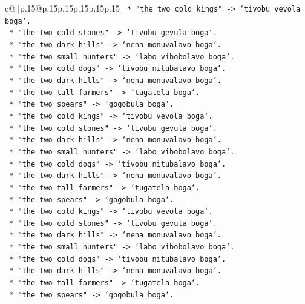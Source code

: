 \documentclass{article}
\begin{document}
{\begin{supertabular}{c@{$\;$}|p{.15\linewidth}@{}p{.15\linewidth}p{.15\linewidth}p{.15\linewidth}p{.15\linewidth}p{.15\linewidth}}
{{{\texttt{        *   "the two cold kings" {-}> `tivobu vevola boga`.} \\
\texttt{        *   "the two cold stones" {-}> `tivobu gevula boga`.} \\
\texttt{        *   "the two dark hills" {-}> `nena monuvalavo boga`.} \\
\texttt{        *   "the two small hunters" {-}> `labo vibobolavo boga`.} \\
\texttt{        *   "the two cold dogs" {-}> `tivobu nitubalavo boga`.} \\
\texttt{        *   "the two dark hills" {-}> `nena monuvalavo boga`.} \\
\texttt{        *   "the two tall farmers" {-}> `tugatela boga`.} \\
\texttt{        *   "the two spears" {-}> `gogobula boga`.} \\
\texttt{        *   "the two cold kings" {-}> `tivobu vevola boga`.} \\
\texttt{        *   "the two cold stones" {-}> `tivobu gevula boga`.} \\
\texttt{        *   "the two dark hills" {-}> `nena monuvalavo boga`.} \\
\texttt{        *   "the two small hunters" {-}> `labo vibobolavo boga`.} \\
\texttt{        *   "the two cold dogs" {-}> `tivobu nitubalavo boga`.} \\
\texttt{        *   "the two dark hills" {-}> `nena monuvalavo boga`.} \\
\texttt{        *   "the two tall farmers" {-}> `tugatela boga`.} \\
\texttt{        *   "the two spears" {-}> `gogobula boga`.} \\
\texttt{        *   "the two cold kings" {-}> `tivobu vevola boga`.} \\
\texttt{        *   "the two cold stones" {-}> `tivobu gevula boga`.} \\
\texttt{        *   "the two dark hills" {-}> `nena monuvalavo boga`.} \\
\texttt{        *   "the two small hunters" {-}> `labo vibobolavo boga`.} \\
\texttt{        *   "the two cold dogs" {-}> `tivobu nitubalavo boga`.} \\
\texttt{        *   "the two dark hills" {-}> `nena monuvalavo boga`.} \\
\texttt{        *   "the two tall farmers" {-}> `tugatela boga`.} \\
\texttt{        *   "the two spears" {-}> `gogobula boga`.} \\
}}}
\end{supertabular}}
\end{document}
